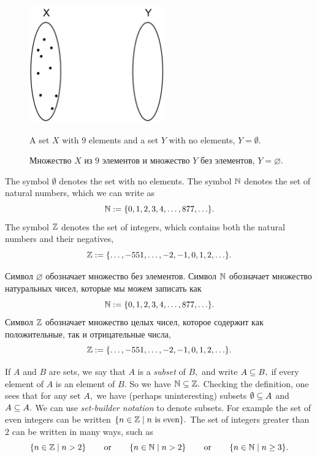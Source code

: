 \documentclass[CT4S-EN-RU]{subfiles}
\begin{document}
\begin{figure}
\begin{center}
\includegraphics[height=2in]{aSet}
\end{center}
\begin{blockENG}
\caption{A set $X$ with $9$ elements and a set $Y$ with no elements, $Y=\emptyset.$}
\end{blockENG}
\begin{blockRUS}
\caption{Множество $X$ из $9$ элементов и множество $Y$ без элементов, $Y=\varnothing.$}
\end{blockRUS}
\end{figure}

\begin{notationENG}\label{not:basic math notation}
The symbol $\emptyset$ denotes the set with no elements. The symbol $\NN$ denotes the set of natural numbers, which we can write as 
$$\NN:=\{0,1,2,3,4,\ldots,877,\ldots\}.$$
The symbol $\ZZ$ denotes the set of integers, which contains both the natural numbers and their negatives, 
$$\ZZ:=\{\ldots,-551,\ldots,-2,-1,0,1,2,\ldots\}.$$ 
\end{notationENG}

\begin{notationRUS}\label{not:basic math notation}
Символ $\varnothing$ обозначает множество без элементов. Символ $\NN$ обозначает множество натуральных чисел, которые мы можем записать как 
$$\NN:=\{0,1,2,3,4,\ldots,877,\ldots\}.$$
Символ $\ZZ$ обозначает множество целых чисел, которое содержит как положительные, так и отрицательные числа, 
$$\ZZ:=\{\ldots,-551,\ldots,-2,-1,0,1,2,\ldots\}.$$ 
\end{notationRUS}

\begin{notationENG}\label{not:basic math notation}
If $A$ and $B$ are sets, we say that $A$ is a {\em subset} of $B,$ and write $A\ss B,$ if every element of $A$ is an element of $B.$ So we have $\NN\ss\ZZ.$ Checking the definition, one sees that for any set $A,$ we have (perhaps uninteresting) subsets $\emptyset\ss A$ and $A\ss A.$ We can use {\em set-builder notation} to denote subsets. For example the set of even integers can be written $\{n\in\ZZ\|n\tn{ is even}\}.$ The set of integers greater than $2$ can be written in many ways, such as $$\{n\in\ZZ\|n>2\} \hsp\tn{or}\hsp\{n\in\NN\|n>2\}\hsp\tn{or}\hsp\{n\in\NN\|n\geq 3\}.$$
\end{notationENG}
\end{document}
